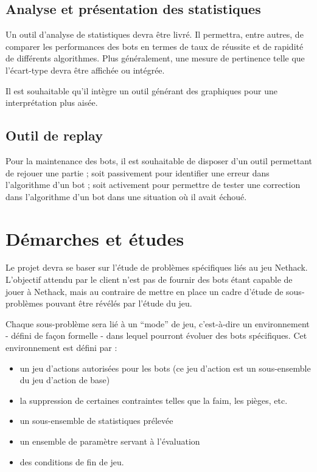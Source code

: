 \documentclass[12pt]{article}
\begin{document}
\subsection{Analyse et présentation des statistiques}

Un outil d'analyse de statistiques devra être livré. Il permettra, entre autres, de comparer les performances des bots en termes de taux de réussite et de rapidité de différents algorithmes. Plus généralement, une mesure de pertinence telle que l'écart-type devra être affichée ou intégrée.

Il est souhaitable qu'il intègre un outil générant des graphiques pour une interprétation plus aisée.

\subsection{Outil de replay}

Pour la maintenance des bots, il est souhaitable de disposer d'un outil permettant de rejouer une partie ; soit passivement pour identifier une erreur dans l'algorithme d'un bot ; soit activement pour permettre de tester une correction dans l'algorithme d'un bot dans une situation où il avait échoué.

\section{Démarches et études}

Le projet devra se baser sur l'étude de problèmes spécifiques liés au jeu Nethack. L'objectif attendu par le client n'est pas de fournir des bots étant capable de jouer à Nethack, mais au contraire de mettre en place un cadre d'étude de sous-problèmes pouvant être révélés par l'étude du jeu.

Chaque sous-problème sera lié à un ``mode'' de jeu, c'est-à-dire un environnement - défini de façon formelle - dans lequel pourront évoluer des bots spécifiques. Cet environnement est défini par : 
\begin{itemize}
	\item un jeu d'actions autorisées pour les bots (ce jeu d'action est un sous-ensemble du jeu d'action de base) 
	\item la suppression de certaines contraintes telles que la faim, les pièges, etc. 
	\item un sous-ensemble de statistiques prélevée 
	\item un ensemble de paramètre servant à l'évaluation 
	\item des conditions de fin de jeu.
\end{itemize}
\end{document}
